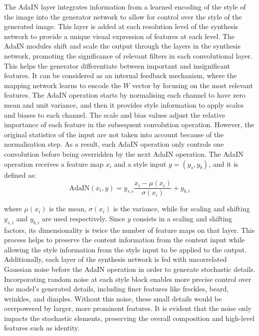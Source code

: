 The AdaIN layer integrates information from a learned encoding of the style of the image into the generator network to allow for control over the style of the generated image. This layer is added at each resolution level of the synthesis network to provide a unique visual expression of features at each level.
The AdaIN modules shift and scale the output through the layers in the synthesis network, promoting the significance of relevant filters in each convolutional layer. 
This helps the generator differentiate between important and insignificant features. It can be considered as an internal feedback mechanism, where the mapping network learns to encode the $W$ vector by focusing on the most relevant features. 
The AdaIN operation starts by normalising each channel to have zero mean and unit variance, and then it provides style information to apply scales and biases to each channel. 
The scale and bias values adjust the relative importance of each feature in the subsequent convolution operation. However, the original statistics of the input are not taken into account because of the normalisation step. As a result, each AdaIN operation only controls one convolution before being overridden by the next AdaIN operation.
The AdaIN operation receives a feature map $x_i$ and a style input $y=(y_s,y_b)$, and it is defined as:
\begin{equation}
    \mbox{AdaIN}(x_i,y)=y_{s,i}\frac{x_i - \mu (x_i)}{\sigma(x_i)}+y_{b,i}
\end{equation}

\noindent where $\mu(x_i)$ is the mean, $\sigma(x_i)$ is the variance, while for scaling and shifting $y_{s,i}$ and $y_{b,i}$ are used respectively. Since $y$ consists in a scaling and shifting factors, its dimensionality is twice the number of feature maps on that layer.
This process helps to preserve the content information from the content input while allowing the style information from the style input to be applied to the output.
Additionally, each layer of the synthesis network is fed with uncorrelated Gaussian noise before the AdaIN operation in order to generate stochastic details. Incorporating random noise at each style block enables more precise control over the model's generated details, including finer features like freckles, beard, wrinkles, and dimples. Without this noise, these small details would be overpowered by larger, more prominent features. It is evident that the noise only impacts the stochastic elements, preserving the overall composition and high-level features such as identity.\\

